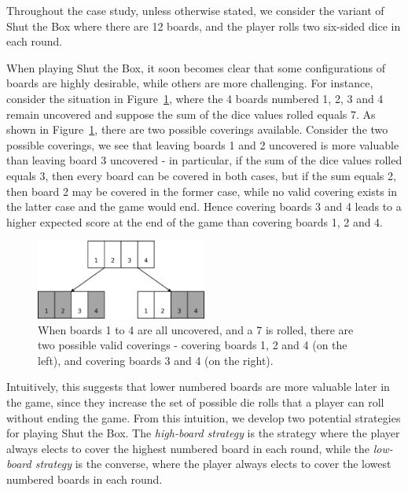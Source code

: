 Throughout the case study, unless otherwise stated, we consider the variant of Shut the Box where there are 12 boards, and the player rolls two six-sided dice in each round.

When playing Shut the Box, it soon becomes clear that some configurations of boards are highly desirable, while others are more challenging. For instance, consider the situation in Figure~\ref{cs1:cover_choice}, where the 4 boards numbered 1, 2, 3 and 4 remain uncovered and suppose the sum of the dice values rolled equals 7. As shown in Figure~\ref{cs1:cover_choice}, there are two possible coverings available. Consider the two possible coverings, we see that leaving boards 1 and 2 uncovered is more valuable than leaving board 3 uncovered - in particular, if the sum of the dice values rolled equals 3, then every board can be covered in both cases, but if the sum equals 2, then board 2 may be covered in the former case, while no valid covering exists in the latter case and the game would end. Hence covering boards 3 and 4 leads to a higher expected score at the end of the game than covering boards 1, 2 and 4.

\begin{figure}
    \centering
    \includegraphics[width=0.5\textwidth]{images/cover_choice.pdf}
    \caption{When boards 1 to 4 are all uncovered, and a 7 is rolled, there are two possible valid coverings - covering boards 1, 2 and 4 (on the left), and covering boards 3 and 4 (on the right).}
    \label{cs1:cover_choice}
\end{figure}

Intuitively, this suggests that lower numbered boards are more valuable later in the game, since they increase the set of possible die rolls that a player can roll without ending the game. From this intuition, we develop two potential strategies for playing Shut the Box. The \emph{high-board strategy} is the strategy where the player always elects to cover the highest numbered board in each round, while the \emph{low-board strategy} is the converse, where the player always elects to cover the lowest numbered boards in each round.

